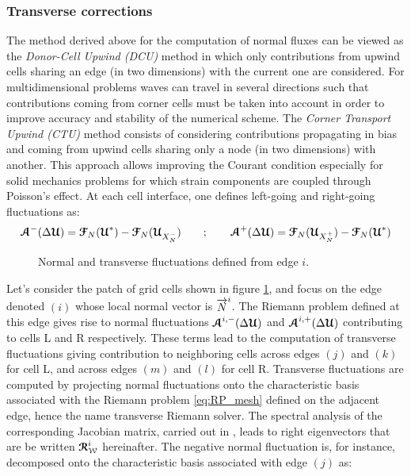 \subsubsection*{Transverse corrections}

The method derived above for the computation of normal fluxes can be viewed as the \textit{Donor-Cell Upwind (DCU)} method \cite{Leveque} in which only contributions from upwind cells sharing an edge (in two dimensions) with the current one are considered.
For multidimensional problems waves can travel in several directions such that contributions coming from corner cells must be taken into account in order to improve accuracy and stability of the numerical scheme.
The \textit{Corner Transport Upwind (CTU)} method \cite{Colella_CTU} consists of considering contributions propagating in bias and coming from upwind cells sharing only a node (in two dimensions) with another.
This approach allows improving the Courant condition especially for solid mechanics problems for which strain components are coupled through Poisson's effect.
At each cell interface, one defines left-going and right-going fluctuations as:
\begin{equation}
  {\boldsymbol{\mathcal{A}}}^-(\Delta {\boldsymbol{\mathcal{U}}}) = {\boldsymbol{\mathcal{F}}}_N({\boldsymbol{\mathcal{U}}}^*) - {\boldsymbol{\mathcal{F}}}_N({\boldsymbol{\mathcal{U}}}_{X_N^-}) \qquad ;  \qquad {\boldsymbol{\mathcal{A}}}^+(\Delta {\boldsymbol{\mathcal{U}}}) = {\boldsymbol{\mathcal{F}}}_N({\boldsymbol{\mathcal{U}}}_{X_N^+})-{\boldsymbol{\mathcal{F}}}_N({\boldsymbol{\mathcal{U}}}^*) 
\end{equation}
\begin{figure}[h!]
  \centering
  
  \caption{Normal and transverse fluctuations defined from edge $i$.}
  \label{fig:CTU}
\end{figure}
Let's consider the patch of grid cells shown in figure \ref{fig:CTU}, and focus on the edge denoted $(i)$ whose local normal vector is ${\overrightarrow{N}}^i$. The Riemann problem defined at this edge gives rise to normal fluctuations ${\boldsymbol{\mathcal{A}}}^{i,-}(\Delta {\boldsymbol{\mathcal{U}}})$ and ${\boldsymbol{\mathcal{A}}}^{i,+}(\Delta {\boldsymbol{\mathcal{U}}})$ contributing to cells L and R respectively.
These terms lead to the computation of transverse fluctuations giving contribution to neighboring cells across edges $(j)$ and $(k)$ for cell L, and across edges $(m)$ and $(l)$ for cell R.
Transverse fluctuations are computed by projecting normal fluctuations onto the characteristic basis associated with the Riemann problem \eqref{eq:RP_mesh} defined on the adjacent edge, hence the name transverse Riemann solver.
The spectral analysis of the corresponding Jacobian matrix, carried out in \cite{Kluth}, leads to right eigenvectors that are be written ${\boldsymbol{\mathcal{R}}}_{\mathcal{W}}^i$ hereinafter.
The negative normal fluctuation is, for instance, decomposed onto the characteristic basis associated with edge $(j)$ as:
